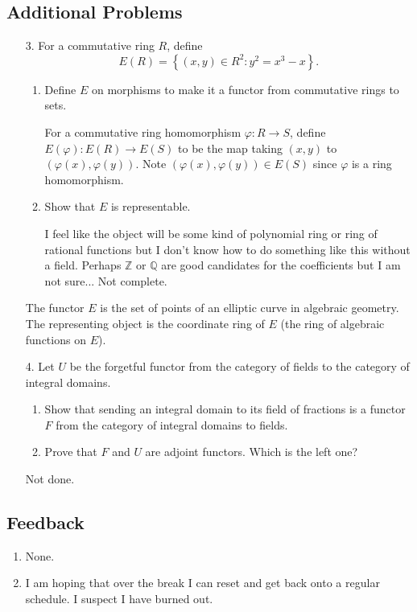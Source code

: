 \documentclass[11pt]{article}
\newcommand{\cbr}[1]{\left\{#1\right\}}
\begin{document}
\subsection*{Additional Problems}
\begin{enumerate}
    \item[3.] For a commutative ring $R$, define \[E(R) = \cbr{(x,y)\in R^2\colon y^2 = x^3-x}.\]\begin{enumerate}[label=(\roman*)]
        \item Define $E$ on morphisms to make it a functor from commutative rings to sets.
        
        For a commutative ring homomorphism $\varphi\colon R\to S$, define $E(\varphi)\colon E(R)\to E(S)$ to be the map taking $(x,y)$ to $(\varphi(x),\varphi(y))$. Note $(\varphi(x),\varphi(y))\in E(S)$ since $\varphi$ is a ring homomorphism.
        \item Show that $E$ is representable.
        
        I feel like the object will be some kind of polynomial ring or ring of rational functions but I don't know how to do something like this without a field. Perhaps $\mathbb{Z}$ or $\mathbb{Q}$ are good candidates for the coefficients but I am not sure... Not complete.
    \end{enumerate} The functor $E$ is the set of points of an elliptic curve in algebraic geometry. The representing object is the coordinate ring of $E$ (the ring of algebraic functions on $E$). 
    \item[4.] Let $U$ be the forgetful functor from the category of fields to the category of integral domains. \begin{enumerate}[label=(\roman*)]
        \item Show that sending an integral domain to its field of fractions is a functor $F$ from the category of integral domains to fields.
        \item Prove that $F$ and $U$ are adjoint functors. Which is the left one?
    \end{enumerate} Not done.
\end{enumerate}
\subsection*{Feedback}
\begin{enumerate}
    \item None.
    \item I am hoping that over the break I can reset and get back onto a regular schedule. I suspect I have burned out.
\end{enumerate}
\end{document}
